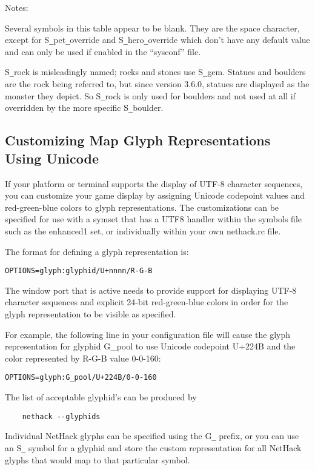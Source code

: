 Notes:

Several symbols in this table appear to be blank.
They are the space character, except for S\verb+_+pet\verb+_+override
and S\verb+_+hero\verb+_+override which don't have any default value
and can only be used if enabled in the ``sysconf'' file.

S\verb+_+rock is misleadingly named; rocks and stones use S\verb+_+gem.
Statues and boulders are the rock being referred to, but since
version 3.6.0, statues are displayed as the monster they depict.
So S\verb+_+rock is only used for boulders and not used at all if
overridden by the more specific S\verb+_+boulder.

\subsection*{Customizing Map Glyph Representations Using Unicode}

If your platform or terminal supports the display of UTF-8 character
sequences, you can customize your game display by assigning Unicode
codepoint values and red-green-blue colors to glyph
representations. The customizations can be specified for use with a symset that
has a UTF8 handler within the symbols file such as the enhanced1 set, or
individually within your own nethack.rc file.

The format for defining a glyph representation is:\\
\begin{verbatim}
OPTIONS=glyph:glyphid/U+nnnn/R-G-B
\end{verbatim}

The window port that is active needs to provide support for displaying UTF-8
character sequences and explicit 24-bit red-green-blue colors in order for the glyph
representation to be visible as specified.

For example, the following line in your configuration file will cause
the glyph representation for glyphid G_pool to use Unicode codepoint U+224B
and the color represented by R-G-B value 0-0-160:\\
\begin{verbatim}
OPTIONS=glyph:G_pool/U+224B/0-0-160
\end{verbatim}

The list of acceptable glyphid's can be produced by
\begin{verbatim}
    nethack --glyphids
\end{verbatim}
Individual NetHack glyphs can be specified using the G\verb+_+ prefix,
or you can use an S\verb+_+ symbol for a glyphid and store the custom
representation for all NetHack glyphs that would map to that
particular symbol.


